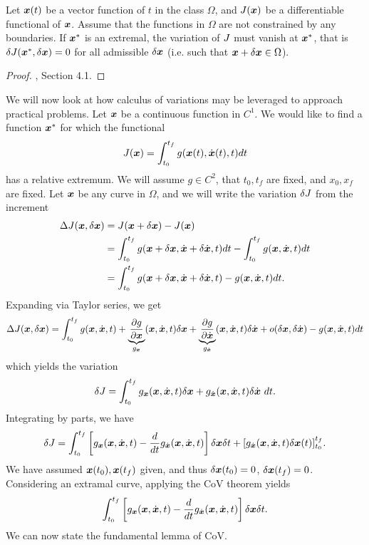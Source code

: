 \begin{theorem}
Let $\bm{x}(t)$ be a vector function of $t$ in the class $\Omega$, and $J(\bm{x})$ be a differentiable functional of $\bm{x}$. Assume that the functions in $\Omega$ are not constrained by any boundaries. If $\bm{x}^*$ is an extremal, the variation of $J$ must vanish at $\bm{x}^*$, that is $\delta J(\bm{x}^*, \delta \bm{x}) = 0$ for all admissible $\delta \bm{x}$ (i.e. such that $\bm{x} + \delta \bm{x} \in \Omega$).
\end{theorem}

\begin{proof}
\cite{kirk2012optimal}, Section 4.1.
\end{proof}

We will now look at how calculus of variations may be leveraged to approach practical problems. Let $\bm{x}$ be a continuous function in $C^1$. We would like to find a function $\bm{x}^*$ for which the functional 
\begin{equation}
    J(\bm{x}) = \int_{t_0}^{t_f} g(\bm{x}(t),\dot{\bm{x}}(t),t) dt
\end{equation}
has a relative extremum. We will assume $g \in C^2$, that $t_0,t_f$ are fixed, and $x_0, x_f$ are fixed. Let $\bm{x}$ be any curve in $\Omega$, and we will write the variation $\delta J$ from the increment
\begin{align}
    \Delta J(\bm{x},\delta \bm{x}) &= J(\bm{x} + \delta \bm{x}) - J(\bm{x})\\
    &= \int_{t_0}^{t_f} g(\bm{x} + \delta \bm{x}, \dot{\bm{x}} + \delta \dot{\bm{x}}, t) dt - \int_{t_0}^{t_f} g(\bm{x},\dot{\bm{x}},t) dt\\
    &= \int_{t_0}^{t_f} g(\bm{x} + \delta \bm{x}, \dot{\bm{x}} + \delta \dot{\bm{x}}, t) - g(\bm{x},\dot{\bm{x}},t) dt.
\end{align}
Expanding via Taylor series, we get
\begin{equation}
    \Delta J(\bm{x},\delta \bm{x}) = \int_{t_0}^{t_f} g(\bm{x},\dot{\bm{x}},t) + \underbrace{\frac{\partial g}{\partial \bm{x}}}_{g_{\bm{x}}} (\bm{x},\dot{\bm{x}}, t) \delta \bm{x} + \underbrace{\frac{\partial g}{\partial \dot{\bm{x}}}}_{g_{\dot{\bm{x}}}} (\bm{x},\dot{\bm{x}}, t) \delta \dot{\bm{x}} + o(\delta \bm{x}, \delta \dot{\bm{x}}) - g(\bm{x},\dot{\bm{x}},t) dt
\end{equation}
which yields the variation
\begin{equation}
    \delta J = \int_{t_0}^{t_f} g_{\bm{x}}(\bm{x},\dot{\bm{x}},t) \delta \bm{x} + g_{\dot{\bm{x}}}(\bm{x},\dot{\bm{x}},t)\delta \dot{\bm{x}} \,\,dt.
\end{equation}
Integrating by parts, we have 
\begin{equation}
    \delta J = \int_{t_0}^{t_f} \left[ g_{\bm{x}}(\bm{x},\dot{\bm{x}},t) - \frac{d}{dt} g_{\dot{\bm{x}}}(\bm{x},\dot{\bm{x}},t)\right] \delta \bm{x} \delta t + [g_{\dot{\bm{x}}}(\bm{x},\dot{\bm{x}},t)\delta \bm{x}(t)]_{t_0}^{t_f}.
\end{equation}
We have assumed $\bm{x}(t_0), \bm{x}(t_f)$ given, and thus $\delta \bm{x}(t_0) = 0$, $\delta \bm{x}(t_f) = 0$. Considering an extramal curve, applying the CoV theorem yields
\begin{equation}
    \int_{t_0}^{t_f} \left[ g_{\bm{x}}(\bm{x},\dot{\bm{x}},t) - \frac{d}{dt} g_{\dot{\bm{x}}}(\bm{x},\dot{\bm{x}},t)\right] \delta \bm{x} \delta t.
    \label{eq:euler_int}
\end{equation}
We can now state the fundamental lemma of CoV.

